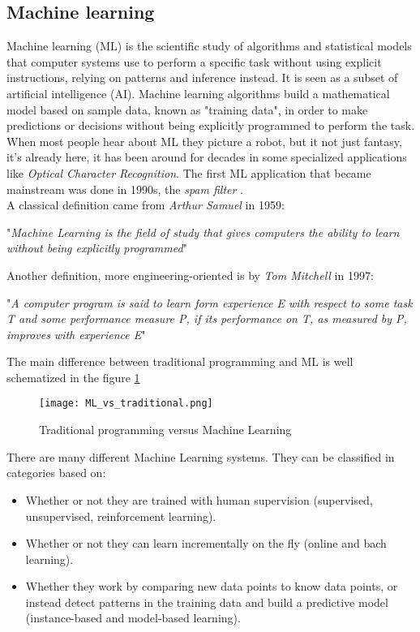 \subsection{Machine learning}
Machine learning (ML) is the scientific study of algorithms and statistical models that computer systems use to perform a specific task without using explicit instructions, relying on patterns and inference instead. It is seen as a subset of artificial intelligence (AI). Machine learning algorithms build a mathematical model based on sample data, known as "training data", in order to make predictions or decisions without being explicitly programmed to perform the task.
\\ \indent
When most people hear about ML they picture a robot, but it not just fantasy, it's already here, it has been around for decades in some specialized applications like \textit{Optical Character Recognition}. The first ML application that became mainstream was done in 1990s, the \textit{spam filter} \cite{geron2019hands}.
\\
A classical definition came from \textit{Arthur Samuel} in 1959:
\begin{center}
"\textit{Machine Learning is the field of study that gives computers the ability to learn without being explicitly programmed}" 
\end{center}
Another definition, more engineering-oriented is by \textit{Tom Mitchell} in 1997:
\begin{center}
"\textit{A computer program is said to learn form experience E with respect to some task T and some performance measure P, if its performance on T, as measured by P, improves with experience E}"
\end{center}
The main difference between traditional programming and ML is well schematized in the figure \ref{fig:ML_vs_traditional}
\begin{figure}[h]
    \centering
    \texttt{[image: ML\_vs\_traditional.png]} 
	\caption{Traditional programming versus Machine Learning}
    \label{fig:ML_vs_traditional}
\end{figure}
There are many different Machine Learning systems. They can be classified in categories based on:
\begin{itemize}
	\item Whether or not they are trained with human supervision (supervised, unsupervised, reinforcement learning).
	\item Whether or not they can learn incrementally on the fly (online and bach learning).
	\item Whether they work by comparing new data points to know data points, or instead detect patterns in the training data and build a predictive model (instance-based and model-based learning).
\end{itemize}
